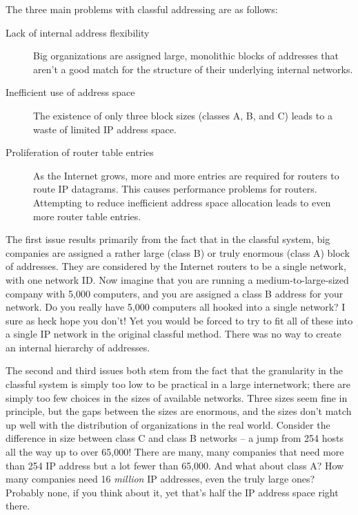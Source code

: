 The three main problems with classful addressing are as follows:
\begin{description}
   \item[Lack of internal address flexibility]
      Big organizations are assigned large, monolithic blocks of addresses that aren't a good match for the structure of their underlying internal networks.

   \item[Inefficient use of address space]
      The existence of only three block sizes (classes A, B, and C) leads to a waste of limited IP address space.

   \item[Proliferation of router table entries]
      As the Internet grows, more and more entries are required for routers to route IP datagrams.
      This causes performance problems for routers.
      Attempting to reduce inefficient address space allocation leads to even more router table entries.
\end{description}

The first issue results primarily from the fact that in the classful
system, big companies are assigned a rather large (class B) or truly
enormous (class A) block of addresses. They are considered by the
Internet routers to be a single network, with one network ID. Now
imagine that you are running a medium-to-large-sized company with 5,000
computers, and you are assigned a class B address for your network. Do
you really have 5,000 computers all hooked into a single network? I sure
as heck hope you don't! Yet you would be forced to try to fit all of
these into a single IP network in the original classful method. There
was no way to create an internal hierarchy of addresses.

The second and third issues both stem from the fact that the granularity
in the classful system is simply too low to be practical in a large
internetwork; there are simply too few choices in the sizes of available
networks. Three sizes seem fine in principle, but the gaps between the
sizes are enormous, and the sizes don't match up well with the
distribution of organizations in the real world. Consider the difference
in size between class C and class B networks -- a jump from 254 hosts all
the way up to over 65,000! There are many, many companies that need more
than 254 IP address but a lot fewer than 65,000. And what about class A?
How many companies need 16 {\emph{million}} IP addresses, even the truly
large ones? Probably none, if you think about it, yet that's half the IP
address space right there.

